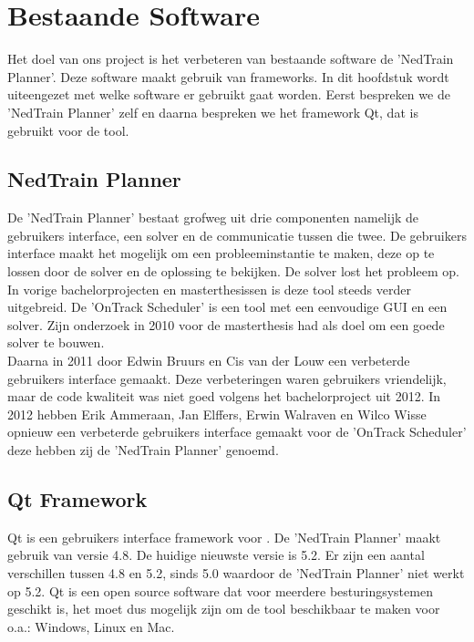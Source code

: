 \section{Bestaande Software}
Het doel van ons project is het verbeteren van bestaande software de 'NedTrain Planner'. Deze software maakt gebruik van frameworks. In dit hoofdstuk wordt uiteengezet met welke software er gebruikt gaat worden. Eerst bespreken we de 'NedTrain Planner' zelf en daarna bespreken we het framework Qt, dat is gebruikt voor de tool. 

\subsection{NedTrain Planner}
De 'NedTrain Planner' bestaat grofweg uit drie componenten namelijk de gebruikers interface, een solver en de communicatie tussen die twee. De gebruikers interface maakt het mogelijk om een probleeminstantie te maken, deze op te lossen door de solver en de oplossing te bekijken. De solver lost het probleem op. \\

In vorige bachelorprojecten en masterthesissen is deze tool steeds verder uitgebreid. De 'OnTrack Scheduler' is een tool met een eenvoudige GUI en een solver. Zijn onderzoek in 2010 voor de masterthesis had als doel om een goede solver te bouwen. \cite{ronaldevers2010} \\

Daarna in 2011 door Edwin Bruurs en Cis van der Louw een verbeterde gebruikers interface gemaakt.\cite{bep2011nedtrain} Deze verbeteringen waren gebruikers vriendelijk, maar de code kwaliteit was niet goed volgens het bachelorproject uit 2012.\cite{bep2012nedtrain} In 2012 hebben Erik Ammeraan, Jan Elffers, Erwin Walraven en Wilco Wisse opnieuw een verbeterde gebruikers interface gemaakt voor de 'OnTrack Scheduler' deze hebben zij de 'NedTrain Planner' genoemd.

\subsection{Qt Framework}
Qt is een gebruikers interface framework voor \cpp . De 'NedTrain Planner' maakt gebruik van versie 4.8. De huidige nieuwste versie is 5.2. Er zijn een aantal verschillen tussen 4.8 en 5.2, sinds 5.0 waardoor de 'NedTrain Planner' niet werkt op 5.2. Qt is een open source software dat voor meerdere besturingsystemen geschikt is, het moet dus mogelijk zijn om de tool beschikbaar te maken voor o.a.: Windows, Linux en Mac. 
